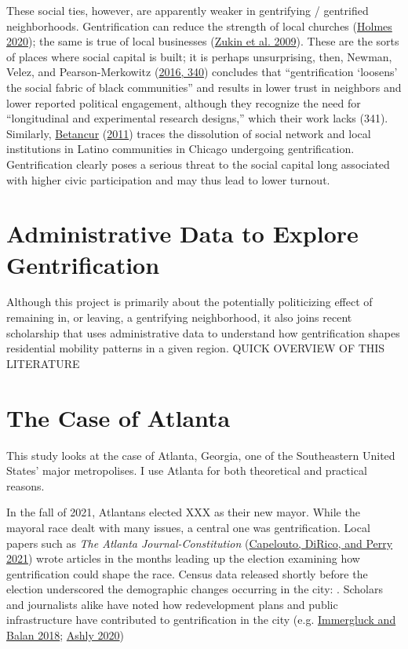 \documentclass[
  12pt,
]{article}
\begin{document}
These social ties, however, are apparently weaker in gentrifying / gentrified neighborhoods. Gentrification can reduce the strength of local churches (\protect\hyperlink{ref-Holmes2020}{Holmes 2020}); the same is true of local businesses (\protect\hyperlink{ref-Zukin2009}{Zukin et al. 2009}). These are the sorts of places where social capital is built; it is perhaps unsurprising, then, Newman, Velez, and Pearson-Merkowitz (\protect\hyperlink{ref-Newman2016}{2016, 340}) concludes that ``gentrification `loosens' the social fabric of black communities'' and results in lower trust in neighbors and lower reported political engagement, although they recognize the need for ``longitudinal and experimental research designs,'' which their work lacks (341). Similarly, \protect\hyperlink{ref-Betancur2011}{Betancur} (\protect\hyperlink{ref-Betancur2011}{2011}) traces the dissolution of social network and local institutions in Latino communities in Chicago undergoing gentrification. Gentrification clearly poses a serious threat to the social capital long associated with higher civic participation and may thus lead to lower turnout.

\hypertarget{administrative-data-to-explore-gentrification}{%
\section*{Administrative Data to Explore Gentrification}\label{administrative-data-to-explore-gentrification}}

Although this project is primarily about the potentially politicizing effect of remaining in, or leaving, a gentrifying neighborhood, it also joins recent scholarship that uses administrative data to understand how gentrification shapes residential mobility patterns in a given region. QUICK OVERVIEW OF THIS LITERATURE

\hypertarget{the-case-of-atlanta}{%
\section*{The Case of Atlanta}\label{the-case-of-atlanta}}

This study looks at the case of Atlanta, Georgia, one of the Southeastern United States' major metropolises. I use Atlanta for both theoretical and practical reasons.

In the fall of 2021, Atlantans elected XXX as their new mayor. While the mayoral race dealt with many issues, a central one was gentrification. Local papers such as \emph{The Atlanta Journal-Constitution} (\protect\hyperlink{ref-Capelouto2021}{Capelouto, DiRico, and Perry 2021}) wrote articles in the months leading up the election examining how gentrification could shape the race. Census data released shortly before the election underscored the demographic changes occurring in the city: . Scholars and journalists alike have noted how redevelopment plans and public infrastructure have contributed to gentrification in the city (e.g. \protect\hyperlink{ref-Immergluck2018}{Immergluck and Balan 2018}; \protect\hyperlink{ref-Ashly2020}{Ashly 2020})
\end{document}
